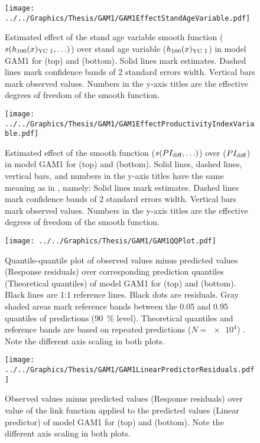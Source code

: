\begin{figure}[h]
  \centering
  \texttt{[image: ../../Graphics/Thesis/GAM1/GAM1EffectStandAgeVariable.pdf]}
  \caption{Estimated effect of the stand age variable smooth function (\(s(h_{100}(x)_{\text{YC 1}}{}, \ldots)\)) over stand age variable (\(h_{100}(x)_{\text{YC 1}}{}\)) in model GAM1 for \Beech{} (top) and \Spruce{} (bottom).  Solid lines mark estimates.  Dashed lines mark confidence bands of 2 standard errors width.  Vertical bars mark observed values.  Numbers in the y-axis titles are the effective degrees of freedom of the smooth function.}
  \label{fig:GAM1EffectStandAgeVariable}
\end{figure}

\begin{figure}[h]
  \centering
  \texttt{[image: ../../Graphics/Thesis/GAM1/GAM1EffectProductivityIndexVariable.pdf]}
  \caption{Estimated effect of the \ProductivityIndexVariableText{} smooth function (\(s(PI_{\text{diff}}{}, \ldots)\)) over \ProductivityIndexVariableText{} (\(PI_{\text{diff}}{}\)) in model GAM1 for \Beech{} (top) and \Spruce{} (bottom).  Solid lines, dashed lines, vertical bars, and numbers in the y-axis titles have the same meaning as in , namely:  Solid lines mark estimates.  Dashed lines mark confidence bands of 2 standard errors width.  Vertical bars mark observed values.  Numbers in the y-axis titles are the effective degrees of freedom of the smooth function.}
  \label{fig:GAM1EffectProductivityIndexVariable}
\end{figure}

\begin{figure}[h]
  \centering
  \texttt{[image: ../../Graphics/Thesis/GAM1/GAM1QQPlot.pdf]}
  \caption{Quantile-quantile plot of observed values minus predicted values (Response residuals) over corresponding prediction quantiles (Theoretical quantiles) of model GAM1 for \Beech{} (top) and \Spruce{} (bottom).  Black lines are 1:1 reference lines.  Black dots are residuals.  Gray shaded areas mark reference bands between the \num{0.05} and \num{0.95} quantiles of predictions (\SI{90}{\percent} level).  Theoretical quantiles and reference bands are based on repeated predictions (\(N = \num{e4}\)) \parencite{Augustin2012}.  Note the different axis scaling in both plots.}
  \label{fig:GAM1QQPlot}
\end{figure}

\begin{figure}[h]
  \centering
  \texttt{[image: ../../Graphics/Thesis/GAM1/GAM1LinearPredictorResiduals.pdf]}
  \caption{Observed values minus predicted values (Response residuals) over value of the link function applied to the predicted values (Linear predictor) of model GAM1 for \Beech{} (top) and \Spruce{} (bottom).  Note the different axis scaling in both plots.}
  \label{fig:GAM1LinearPredictorResiduals}
\end{figure}

